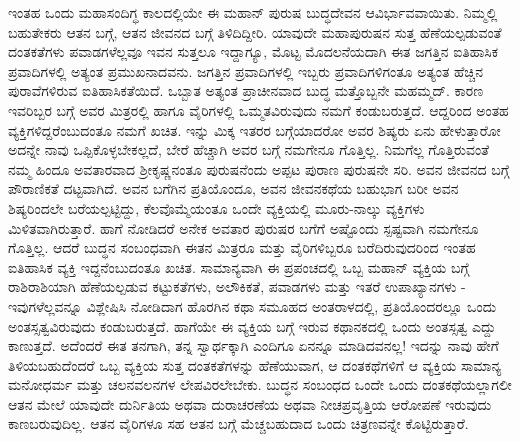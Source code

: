 ಇಂತಹ ಒಂದು ಮಹಾಸಂದಿಗ್ಧ ಕಾಲದಲ್ಲಿಯೇ ಈ ಮಹಾನ್ ಪುರುಷ ಬುದ್ಧದೇವನ ಆವಿರ್ಭಾವವಾಯಿತು. ನಿಮ್ಮಲ್ಲಿ ಬಹುತೇಕರು ಆತನ ಬಗ್ಗೆ, ಆತನ ಜೀವನದ ಬಗ್ಗೆ ತಿಳಿದಿದ್ದೀರಿ. ಯಾವುದೇ ಮಹಾಪುರುಷನ ಸುತ್ತ ಹೆಣೆಯಲ್ಪಡುವಂತೆ ದಂತಕತೆಗಳು ಪವಾಡಗಳೆಲ್ಲವೂ ಇವನ ಸುತ್ತಲೂ ಇದ್ದಾಗ್ಯೂ, ಮೊಟ್ಟ ಮೊದಲನೆಯದಾಗಿ ಈತ ಜಗತ್ತಿನ ಐತಿಹಾಸಿಕ ಪ್ರವಾದಿಗಳಲ್ಲಿ ಅತ್ಯಂತ ಪ್ರಮುಖನಾದವನು. ಜಗತ್ತಿನ ಪ್ರವಾದಿಗಳಲ್ಲಿ ಇಬ್ಬರು ಪ್ರವಾದಿಗಳಿಗಂತೂ ಅತ್ಯಂತ ಹೆಚ್ಚಿನ ಪುರಾವೆಗಳಿರುವ ಐತಿಹಾಸಿಕತೆಯಿದೆ. ಒಬ್ಬಾತ ಅತ್ಯಂತ ಪ್ರಾಚೀನವಾದ ಬುದ್ಧ ಮತ್ತೊಬ್ಬನೇ ಮಹಮ್ಮದ್. ಕಾರಣ ಇವರಿಬ್ಬರ ಬಗ್ಗೆ ಅವರ ಮಿತ್ರರಲ್ಲಿ ಹಾಗೂ ವೈರಿಗಳಲ್ಲಿ ಒಮ್ಮತವಿರುವುದು ನಮಗೆ ಕಂಡುಬರುತ್ತದೆ. ಆದ್ದರಿಂದ ಅಂತಹ ವ್ಯಕ್ತಿಗಳಿದ್ದರೆಂಬುದಂತೂ ನಮಗೆ ಖಚಿತ. ಇನ್ನು ಮಿಕ್ಕ ಇತರರ ಬಗ್ಗೆಯಾದರೋ ಅವರ ಶಿಷ್ಯರು ಏನು ಹೇಳುತ್ತಾರೋ ಅದನ್ನೇ ನಾವು ಒಪ್ಪಿಕೊಳ್ಳಬೇಕಲ್ಲದೆ, ಬೇರೆ ಹೆಚ್ಚಾಗಿ ಅವರ ಬಗ್ಗೆ ನಮಗೇನೂ ಗೊತ್ತಿಲ್ಲ. ನಿಮಗೆಲ್ಲ ಗೊತ್ತಿರುವಂತೆ ನಮ್ಮ ಹಿಂದೂ ಅವತಾರವಾದ ಶ‍್ರೀಕೃಷ್ಣನಂತೂ ಪುರುಷನೆಂದು ಅಪ್ಪಟ ಪುರಾಣ ಪುರುಷನೇ ಸರಿ. ಅವನ ಜೀವನದ ಬಗ್ಗೆ ಪೌರಾಣಿಕತೆ ದಟ್ಟವಾಗಿದೆ. ಅವನ ಬಗೆಗಿನ ಪ್ರತಿಯೊಂದೂ, ಅವನ ಜೀವನಕಥೆಯ ಬಹುಭಾಗ ಬರೀ ಅವನ ಶಿಷ್ಯರಿಂದಲೇ ಬರೆಯಲ್ಪಟ್ಟಿದ್ದು, ಕೆಲವೊಮ್ಮೆಯಂತೂ ಒಂದೇ ವ್ಯಕ್ತಿಯಲ್ಲಿ ಮೂರು-ನಾಲ್ಕು ವ್ಯಕ್ತಿಗಳು ಮಿಳಿತವಾಗಿರುತ್ತಾರೆ. ಹಾಗೆ ನೋಡಿದರೆ ಅನೇಕ ಅವತಾರ ಪುರುಷರ ಬಗೆಗೆ ಅಷ್ಟೊಂದು ಸ್ಪಷ್ಟವಾಗಿ ನಮಗೇನೂ ಗೊತ್ತಿಲ್ಲ. ಆದರೆ ಬುದ್ಧನ ಸಂಬಂಧವಾಗಿ ಈತನ ಮಿತ್ರರೂ ಮತ್ತು ವೈರಿಗಳಿಬ್ಬರೂ ಬರೆದಿರುವುದರಿಂದ ಇಂತಹ ಐತಿಹಾಸಿಕ ವ್ಯಕ್ತಿ ಇದ್ದನೆಂಬುದಂತೂ ಖಚಿತ. ಸಾಮಾನ್ಯವಾಗಿ ಈ ಪ್ರಪಂಚದಲ್ಲಿ ಒಬ್ಬ ಮಹಾನ್ ವ್ಯಕ್ತಿಯ ಬಗ್ಗೆ ರಾಶಿರಾಶಿಯಾಗಿ ಹೆಣೆಯಲ್ಪಡುವ ಕಟ್ಟುಕತೆಗಳು, ಅಲೌಕಿಕತೆ, ಪವಾಡಗಳು ಮತ್ತು ಇತರೆ ಉಪಾಖ್ಯಾನಗಳು - ಇವುಗಳೆಲ್ಲವನ್ನೂ ವಿಶ್ಲೇಷಿಸಿ ನೋಡಿದಾಗ ಹೊರಗಿನ ಕಥಾ ಸಮೂಹದ ಅಂತರಾಳದಲ್ಲಿ, ಪ್ರತಿಯೊಂದರಲ್ಲೂ ಒಂದು ಅಂತಸ್ಸತ್ವವಿರುವುದು ಕಂಡುಬರುತ್ತದೆ. ಹಾಗೆಯೇ ಈ ವ್ಯಕ್ತಿಯ ಬಗ್ಗೆ ಇರುವ ಕಥಾನಕದಲ್ಲಿ ಒಂದು ಅಂತಸ್ಸತ್ವ ಎದ್ದು ಕಾಣುತ್ತದೆ. ಅದೆಂದರೆ ಈತ ತನಗಾಗಿ, ತನ್ನ ಸ್ವಾರ್ಥಕ್ಕಾಗಿ ಎಂದಿಗೂ ಏನನ್ನೂ ಮಾಡಿದವನಲ್ಲ! ಇದನ್ನು ನಾವು ಹೇಗೆ ತಿಳಿಯಬಹುದೆಂದರೆ ಒಬ್ಬ ವ್ಯಕ್ತಿಯ ಸುತ್ತ ದಂತಕತೆಗಳನ್ನು ಹೆಣೆಯುವಾಗ, ಆ ದಂತಕಥೆಗಳಿಗೆ ಆ ವ್ಯಕ್ತಿಯ ಸಾಮಾನ್ಯ ಮನೋಧರ್ಮ ಮತ್ತು ಚಲನವಲನಗಳ ಲೇಪವಿರಲೇಬೇಕು. ಬುದ್ಧನ ಸಂಬಂಧದ ಒಂದೇ ಒಂದು ದಂತಕಥೆಯಲ್ಲಾಗಲೀ ಆತನ ಮೇಲೆ ಯಾವುದೇ ದುರ್ನಿತಿಯ ಅಥವಾ ದುರಾಚರಣೆಯ ಅಥವಾ ನೀಚಪ್ರವೃತ್ತಿಯ ಆರೋಪಣೆ ಇರುವುದು ಕಾಣಬರುವುದಿಲ್ಲ. ಆತನ ವೈರಿಗಳೂ ಸಹ ಆತನ ಬಗ್ಗೆ ಮೆಚ್ಚಬಹುದಾದ ಒಂದು ಚಿತ್ರಣವನ್ನೇ ಕೊಟ್ಟಿರುತ್ತಾರೆ.

